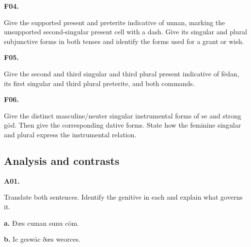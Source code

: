 \par\begin{minipage}{\linewidth}\raggedright
\textbf{F04.}

Give the supported present and preterite indicative of unnan, marking the unsupported second-singular present cell with a dash. Give its singular and plural subjunctive forms in both tenses and identify the forms used for a grant or wish.

\end{minipage}\par\addvspace{4pt}

\par\begin{minipage}{\linewidth}\raggedright
\textbf{F05.}

Give the second and third singular and third plural present indicative of fēdan, its first singular and third plural preterite, and both commands.

\end{minipage}\par\addvspace{4pt}

\par\begin{minipage}{\linewidth}\raggedright
\textbf{F06.}

Give the distinct masculine/\allowbreak{}neuter singular instrumental forms of se and strong gōd. Then give the corresponding dative forms. State how the feminine singular and plural express the instrumental relation.

\end{minipage}\par\addvspace{4pt}

\subsection*{Analysis and contrasts}

\par\begin{minipage}{\linewidth}\raggedright
\textbf{A01.}

Translate both sentences. Identify the genitive in each and explain what governs it.

\textbf{a.} Ðæs cuman sunu cōm.

\textbf{b.} Ic geswāc ðæs weorces.

\end{minipage}\par\addvspace{4pt}

